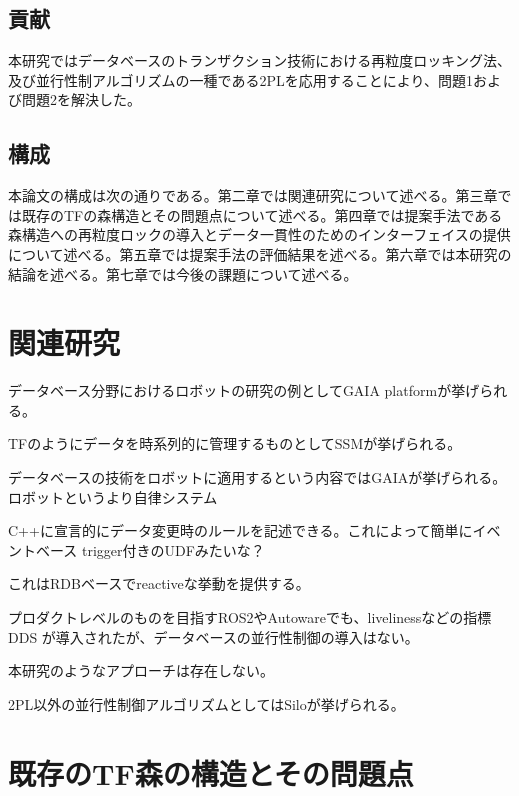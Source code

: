 \documentclass[a4paper]{jreport}	%
\begin{document}
\section{貢献}

本研究ではデータベースのトランザクション技術における再粒度ロッキング法、及び並行性制アルゴリズムの一種である2PLを応用することにより、問題1および問題2を解決した。

\section{構成}
本論文の構成は次の通りである。第二章では関連研究について述べる。第三章では既存のTFの森構造とその問題点について述べる。第四章では提案手法である森構造への再粒度ロックの導入とデータ一貫性のためのインターフェイスの提供について述べる。第五章では提案手法の評価結果を述べる。第六章では本研究の結論を述べる。第七章では今後の課題について述べる。

\chapter{関連研究}
データベース分野におけるロボットの研究の例としてGAIA platform\cite{gaia}が挙げられる。


TFのようにデータを時系列的に管理するものとしてSSMが挙げられる。


データベースの技術をロボットに適用するという内容ではGAIA\cite{gaia}が挙げられる。
ロボットというより自律システム

C++に宣言的にデータ変更時のルールを記述できる。これによって簡単にイベントベース
trigger付きのUDFみたいな？

これはRDBベースでreactiveな挙動を提供する。


プロダクトレベルのものを目指すROS2\cite{ros2}やAutoware\cite{autoware}でも、livelinessなどの指標
DDS
が導入されたが、データベースの並行性制御の導入はない。



本研究のようなアプローチは存在しない。


2PL以外の並行性制御アルゴリズムとしてはSilo\cite{silo}が挙げられる。



\chapter{既存のTF森の構造とその問題点}
\end{document}
